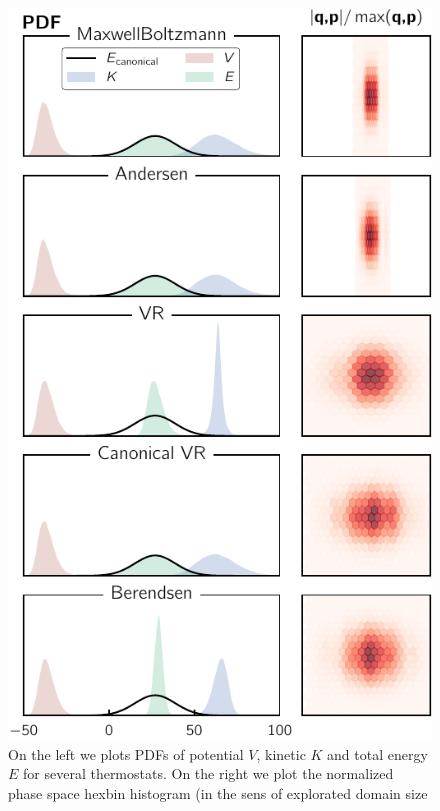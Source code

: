 \documentclass[ansiapaper]{report}
\begin{document}
\begin{multicols}{3}
\begin{figure}[H]
    \begin{center}
        \includegraphics[width=1\linewidth]{figures/thermostats_PDF.pdf}
    \end{center}
    \caption{On the left we plots PDFs of potential $V$, kinetic $K$ and total energy $E$ for several thermostats. On the right we plot the normalized phase space hexbin histogram (in the sens of explorated domain size}\label{fig:PDF-th}
\end{figure}

\end{multicols}
\end{document}
